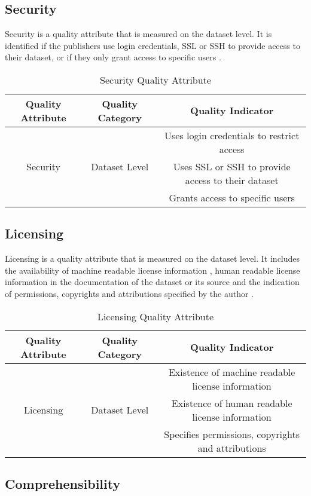 \documentclass[onecolumn, crcready]{iosart2c}
\begin{document}
\subsection{Security}

Security is a quality attribute that is measured on the dataset level. It is identified if the publishers use login credentials, SSL or SSH to provide access to their dataset, or if they only grant access to specific users \cite{Framework2012}.

\begin{table}[!h]
\begin{tabular}{|c|c|c|}
\hline 
Quality Attribute & Quality Category & Quality Indicator\tabularnewline
\hline 
\hline 
\multirow{3}{*}{Security} & \multirow{3}{*}{Dataset Level} & Uses login credentials to restrict access\tabularnewline
\cline{3-3} 
 &  & Uses SSL or SSH to provide access to their dataset\tabularnewline
\cline{3-3} 
 &  & Grants access to specific users\tabularnewline
\hline 
\end{tabular}\caption{Security Quality Attribute}
\end{table}

\subsection{Licensing}

Licensing is a quality attribute that is measured on the dataset level. It includes the availability of machine readable license information \cite{Hogan:2012:ESL:2263498.2264570}, human readable license information in the documentation of the dataset or its source \cite{Hogan:2012:ESL:2263498.2264570} and the indication of permissions, copyrights and attributions specified by the author \cite{Framework2012}.
\begin{table}[h]
\begin{tabular}{|c|c|c|}
\hline 
Quality Attribute & Quality Category & Quality Indicator\tabularnewline
\hline 
\multirow{3}{*}{Licensing} & \multirow{3}{*}{Dataset Level} & Existence of machine readable license information\tabularnewline
\cline{3-3} 
 &  & Existence of human readable license information\tabularnewline
\cline{3-3} 
 &  & Specifies permissions, copyrights and attributions\tabularnewline
\hline 
\end{tabular}\caption{Licensing Quality Attribute}
\end{table}

\subsection{Comprehensibility}
\end{document}

